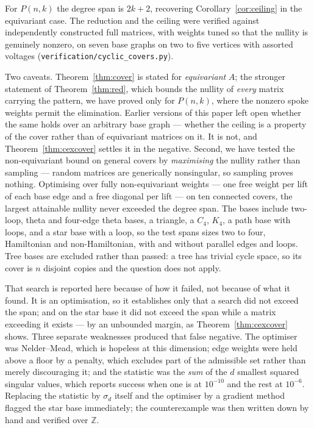 \documentclass[11pt]{article}
\theoremstyle{definition}
\begin{document}
\noindent
For $P(n,k)$ the degree span is $2k+2$, recovering Corollary~\ref{cor:ceiling}
in the equivariant case. The reduction and the ceiling were verified against
independently constructed full matrices, with weights tuned so that the nullity
is genuinely nonzero, on seven base graphs on two to five vertices with assorted
voltages (\texttt{verification/cyclic\_covers.py}).

Two caveats. Theorem~\ref{thm:cover} is stated for \emph{equivariant} $A$;
the stronger statement of Theorem~\ref{thm:red}, which bounds the nullity of
\emph{every} matrix carrying the pattern, we have proved only for $P(n,k)$,
where the nonzero spoke weights permit the elimination. Earlier versions of this
paper left open whether the same holds over an arbitrary base graph --- whether
the ceiling is a property of the cover rather than of equivariant matrices on
it. It is not, and Theorem~\ref{thm:cexcover} settles it in the negative. Second, we have tested the non-equivariant bound on general covers by
\emph{maximising} the nullity rather than sampling --- random matrices are
generically nonsingular, so sampling proves nothing. Optimising over fully
non-equivariant weights --- one free weight per lift of each base edge and a
free diagonal per lift --- on ten connected covers, the largest attainable
nullity never exceeded the degree span. The bases include two-loop, theta and
four-edge theta bases, a triangle, a $C_4$, $K_4$, a path base with loops, and a
star base with a loop, so the test spans sizes two to four, Hamiltonian and
non-Hamiltonian, with and without parallel edges and loops. Tree bases are
excluded rather than passed: a tree has trivial cycle space, so its cover is
$n$ disjoint copies and the question does not apply.

That search is reported here because of how it failed, not because of what it
found. It is an optimisation, so it establishes only that a search did not
exceed the span; and on the star base it did not exceed the span while a matrix
exceeding it exists --- by an unbounded margin, as Theorem~\ref{thm:cexcover}
shows. Three separate weaknesses produced that false negative. The optimiser was
Nelder--Mead, which is hopeless at this dimension; edge weights were held above
a floor by a penalty, which excludes part of the admissible set rather than
merely discouraging it; and the statistic was the \emph{sum} of the $d$ smallest
squared singular values, which reports success when one is at $10^{-10}$ and the
rest at $10^{-6}$. Replacing the statistic by $\sigma_d$ itself and the
optimiser by a gradient method flagged the star base immediately; the
counterexample was then written down by hand and verified over $\mathbb Z$.
\end{document}
